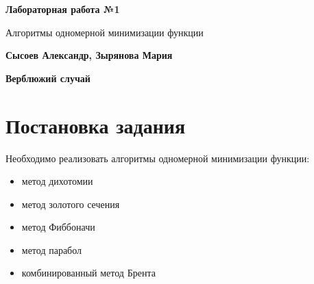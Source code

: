 \documentclass[12pt]{article}
\begin{document}
\begin{titlepage}
   \begin{center}
       \vspace*{1cm}

       \textbf{Лабораторная работа №1}

       \vspace{0.5cm}
        Алгоритмы одномерной минимизации функции
            
       \vspace{1.5cm}

       \textbf{Сысоев Александр, Зырянова Мария}
       
       \textbf{Верблюжий случай}

       \vfill
            
   \end{center}
\end{titlepage}






\section{Постановка задания}

Необходимо реализовать алгоритмы одномерной минимизации функции:

\begin{itemize}
\item метод дихотомии
\item метод золотого сечения
\item метод Фиббоначи
\item метод парабол
\item комбинированный метод Брента
\end{itemize}
\end{document}
